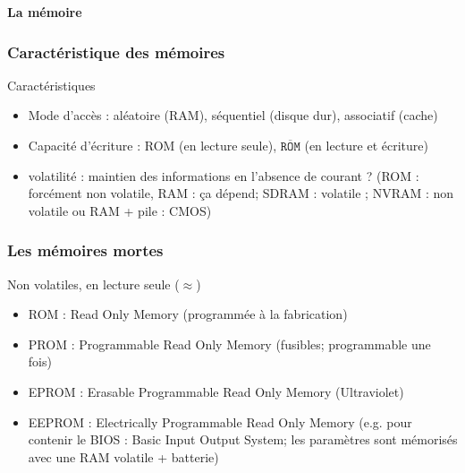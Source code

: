 \documentclass{beamer}
\begin{document}
\begin{frame}
\begin{center}
\textbf{La mémoire}
\end{center}
\end{frame}





\begin{frame}
\frametitle{Caractéristique des mémoires}
\begin{block}{Caractéristiques}
\begin{itemize}
\item Mode d'accès : aléatoire (RAM), séquentiel (disque dur), associatif (cache)
\item Capacité d'écriture : ROM (en lecture seule), $\overline{\mathtt{ROM}}$ (en lecture et écriture)
\item volatilité : maintien des informations en l'absence de courant ? (ROM : forcément non volatile, RAM : ça dépend; SDRAM : volatile ; NVRAM : non volatile ou RAM + pile : CMOS)
\end{itemize}
\end{block}
\end{frame}

\begin{frame}
\frametitle{Les mémoires mortes}
\begin{block}{Non volatiles, en lecture seule ($\approx$)}
\begin{itemize}
\item ROM : Read Only Memory (programmée à la fabrication)
\item PROM : Programmable Read Only Memory (fusibles; programmable une fois)
\item EPROM : Erasable Programmable Read Only Memory (Ultraviolet)
\item EEPROM : Electrically Programmable Read Only Memory (e.g. pour contenir le BIOS : Basic Input Output System; les paramètres sont mémorisés avec une RAM volatile + batterie)
\end{itemize}
\end{block}
\end{frame}
\end{document}

